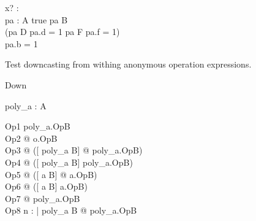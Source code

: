 \begin{axdef}
  x? : \nat\\
  pa : \poly A
\where
  true \land pa \in \poly B\\
  (pa \in D \land pa.d = 1 \lor pa \in F \land pa.f = 1) \\
  pa.b = 1
\end{axdef}

Test downcasting from withing anonymous operation expressions.

\begin{class}{Down}
 \begin{state}
   poly\_a : \poly A
 \end{state}
 Op1  \land poly\_a.OpB\\
 Op2 \sdef [o : \oid | o.b = 1 \land o \in B] @ o.OpB\\
 Op3 \sdef [a : \poly A] @ ([ poly\_a \in B] @ poly\_a.OpB)\\
 Op4 \sdef [a : \poly A] @ ([ poly\_a \in B] \land poly\_a.OpB)\\
 Op5 \sdef [a : \poly A] @ ([ a \in B] @ a.OpB)\\
 Op6 \sdef [a : \poly A] @ ([ a \in B] \land a.OpB)\\
 Op7  @ poly\_a.OpB\\
 Op8 \sdef \dcnj n : \nat | poly\_a \in B @ poly\_a.OpB
\end{class}
